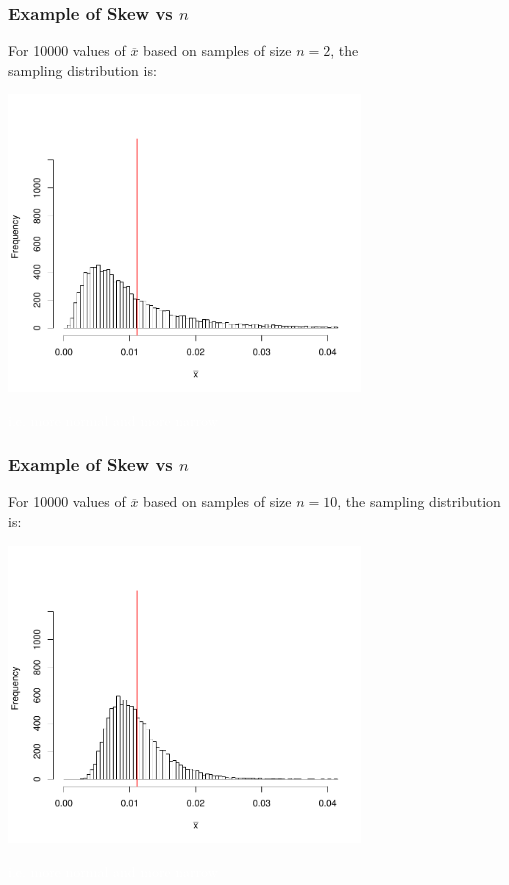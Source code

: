 \documentclass[handout]{beamer}
\newcommand{\blue}[1]{\textcolor{blue2}{#1}}
\newcommand{\white}[1]{\textcolor{white}{#1}}
\newcommand{\xbar}{\overline{x}}
\begin{document}
\begin{frame}
\frametitle{Example of Skew vs $n$}
For 10000 values of $\xbar$ based on samples of size \blue{$n=2$}, the\\
sampling distribution is:
\begin{center}
\includegraphics[width=0.7\textwidth]{figure/hist2.pdf}
\end{center}
\white{i.e. more normal and more narrow}
\end{frame}


\begin{frame}
\frametitle{Example of Skew vs $n$}
For 10000 values of $\xbar$ based on samples of size \blue{$n=10$}, the sampling distribution is:
\begin{center}
\includegraphics[width=0.7\textwidth]{figure/hist10.pdf}
\end{center}
\white{i.e. more normal and more narrow}
\end{frame}
\end{document}
